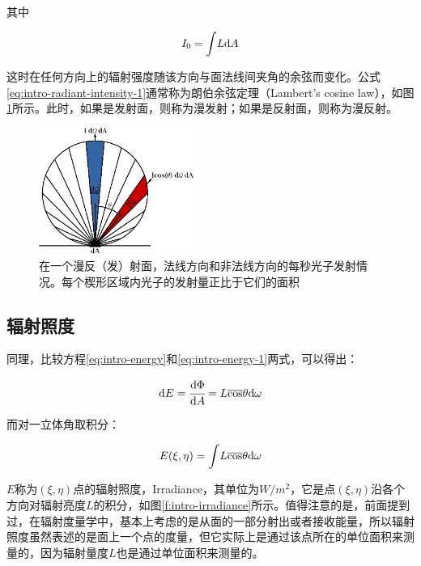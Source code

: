 \noindent 其中

\begin{equation}
	I_0={\rm \int} L{\rm d}A
\end{equation}

\noindent 这时在任何方向上的辐射强度随该方向与面法线间夹角的余弦而变化。公式\ref{eq:intro-radiant-intensity-1}通常称为朗伯余弦定理（Lambert's cosine law），如图\ref{f:intro-lambert-cosine-law}所示。此时，如果是发射面，则称为漫发射；如果是反射面，则称为漫反射。

\begin{figure}
\sidecaption
	\includegraphics[width=0.45\textwidth]{figures/intro/Lambert_Cosine_Law}
	\caption{在一个漫反（发）射面，法线方向和非法线方向的每秒光子发射情况。每个楔形区域内光子的发射量正比于它们的面积}
	\label{f:intro-lambert-cosine-law}
\end{figure}








\subsection{辐射照度}\label{sec:irradiance}
同理，比较方程\ref{eq:intro-energy}和\ref{eq:intro-energy-1}两式，可以得出：

\begin{equation}
	{\rm d}E= \cfrac{{\rm d}\Phi}{{\rm d}A}=L\overline{\cos}\theta {\rm d}\omega
\end{equation}

\noindent 而对一立体角取积分：

\begin{equation}
	E(\xi,\eta)={\rm \int} L\overline{\cos}\theta {\rm d}\omega
\end{equation}

\noindent $E$称为$(\xi,\eta)$点的辐射照度，Irradiance，其单位为$W/m^2$，它是点$(\xi,\eta)$沿各个方向对辐射亮度$L$的积分，如图\ref{f:intro-irradiance}所示。值得注意的是，前面提到过，在辐射度量学中，基本上考虑的是从面的一部分射出或者接收能量，所以辐射照度虽然表述的是面上一个点的度量，但它实际上是通过该点所在的单位面积来测量的，因为辐射量度$L$也是通过单位面积来测量的。

